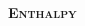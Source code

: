 \documentclass[main.tex]{subfiles}
\begin{document}
\begin{multicols*}{2}


{\raggedright\textsc{\textbf{Enthalpy }}\par}


\end{multicols*}
\end{document}
